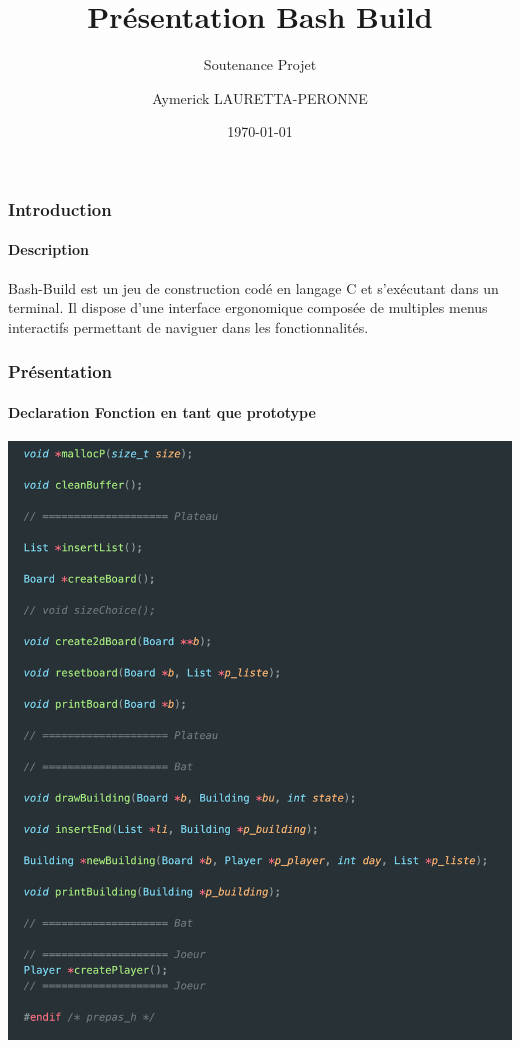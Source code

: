 \documentclass{beamer}
\begin{document}
\title{Présentation Bash Build}
\subtitle[\ldots]{Soutenance Projet}
\author[Aymerick LAURETTA-PERONNE]{Aymerick LAURETTA-PERONNE}
\date{\today}
\maketitle

\begin{frame} %
\frametitle{Introduction}
\framesubtitle{Description}

Bash-Build est un jeu de construction codé en langage C et s’exécutant dans un terminal. Il dispose d’une interface ergonomique composée de multiples menus interactifs permettant de naviguer dans les fonctionnalités.

\end{frame}


\begin{frame} %
\frametitle{Présentation}
\framesubtitle{Declaration Fonction en tant que prototype}

\begin{center}
    \includegraphics[scale=0.25]{src/images/declaration_fonction_as_prototype.png}
\end{center}

\end{frame}
\end{document}
